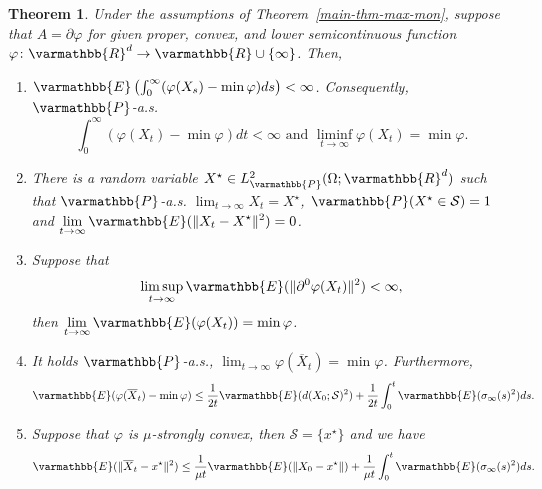 \documentclass[11pt,reqno]{article}
\let\mathbb=\varmathbb
\newcommand{\R}{\mathbb{R}}
\newcommand{\1}{\mathds{1}}
\newcommand{\Aver}[2]{\overline{#1}_{#2}}
\numberwithin{equation}{section}  %
\theoremstyle{plain}
\newtheorem{theorem}{Theorem}
\theoremstyle{definition}
\theoremstyle{remark}
\numberwithin{theorem}{section}
\numberwithin{remark}{section}
\numberwithin{example}{section}
\begin{document}
    
    \begin{theorem}\label{Teo:main:convexfunction}
     Under the assumptions of Theorem~\ref{main-thm-max-mon}, suppose that $A=\partial \varphi$ for given  proper, convex, and lower semicontinuous function 
$\varphi \colon \mathbb{R}^d \to \mathbb{R} \cup \{\infty\}$. Then,
    	\begin{enumerate}[label = (\alph*)]
    		\item $\mathbb{E}\left(\int_0^\infty (\varphi(X_s)-\min \varphi )ds\right) < \infty$. Consequently, $\mathbb{P}$-a.s. $$\int_0^\infty (\varphi(X_t)-\min \varphi) dt<\infty \text{ and }\displaystyle\liminf_{t\to \infty} \varphi(X_t) = \min \varphi.$$
    		\item There is a random variable $X^\star\in L^2_{\mathbb{P}}(\Omega;\R^d)$ such that $\mathbb{P}$-a.s. $\displaystyle\lim_{t\to \infty}X_t = X^\star$, $\mathbb{P}(X^\star\in \mathcal{S}) = 1$ and $\displaystyle\lim_{t\to \infty}\mathbb{E}(\|X_t-X^\star\|^2) = 0$.
            \item Suppose that
            \begin{equation}\label{cond-conv-varphi}
                \displaystyle\limsup_{t\to \infty}\mathbb{E}(\|\partial^0\varphi(X_t)\|^2)<\infty,
            \end{equation} then $\displaystyle\lim_{t\to \infty} \mathbb{E}(\varphi(X_t)) = \min \varphi$.
            \item It holds $\mathbb{P}$-a.s., $\displaystyle\lim_{t\to \infty}\varphi(\Aver{X}{t}) = \min \varphi$. Furthermore,
              $$  \mathbb{E}(\varphi(\Aver{X}{t} )-\min \varphi)\leq \frac{1}{2t}\mathbb{E}(d(X_0;\mathcal{S})^2) + \frac{1}{2t}\int_0^t\mathbb{E}(\sigma_\infty(s)^2) ds.$$
              \item Suppose that $\varphi$ is $\mu$-strongly convex, then $\mathcal{S} = \{x^\star\}$ and we have \begin{equation}\label{ineq-aver-varphi1}
        \mathbb{E}(\|\Aver{X}{t} -x^\star\|^2)\leq \frac{1}{\mu t}\mathbb{E}(\| X_0 - x^\star\|) + \frac{1}{\mu t}\int_0^t\mathbb{E}(\sigma_\infty(s)^2) ds.
    \end{equation}
    	\end{enumerate}
    
    \end{theorem}
\end{document}
